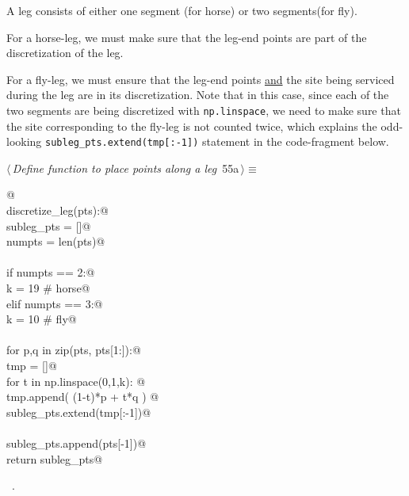 \documentclass[11.5pt]{report}
\begin{document}
A leg consists of either one segment (for horse) or two segments(for fly). 

For a horse-leg, we must make sure that the leg-end points are part of the discretization of the leg. 

For a fly-leg, we must ensure that the leg-end points \underline{and} the site being 
serviced during the leg are in its discretization. Note that in this case, 
since each of the two segments are being discretized with \verb|np.linspace|, we need
to make sure that the site corresponding to the fly-leg is not counted twice, which
explains the odd-looking \verb|subleg_pts.extend(tmp[:-1])| statement in the code-fragment below. 

\begin{flushleft} \small
\begin{minipage}{\linewidth}\label{scrap87}\raggedright\small
{} $\langle\,${\itshape Define function to place points along a leg}\nobreak\ {\footnotesize {55a}}$\,\rangle\equiv$
\vspace{-1ex}
\begin{list}{}{} \item
\mbox{}\verb@   @\\
\mbox{}\verb@def discretize_leg(pts):@\\
\mbox{}\verb@   subleg_pts = []@\\
\mbox{}\verb@   numpts     = len(pts)@\\
\mbox{}\verb@@\\
\mbox{}\verb@   if numpts == 2:@\\
\mbox{}\verb@       k  = 19 # horse@\\
\mbox{}\verb@   elif numpts == 3:@\\
\mbox{}\verb@       k  = 10 # fly@\\
\mbox{}\verb@@\\
\mbox{}\verb@   for p,q in zip(pts, pts[1:]):@\\
\mbox{}\verb@       tmp = []@\\
\mbox{}\verb@       for t in np.linspace(0,1,k): @\\
\mbox{}\verb@           tmp.append( (1-t)*p + t*q ) @\\
\mbox{}\verb@       subleg_pts.extend(tmp[:-1])@\\
\mbox{}\verb@@\\
\mbox{}\verb@   subleg_pts.append(pts[-1])@\\
\mbox{}\verb@   return subleg_pts@\\
\mbox{}\verb@@{\NWsep}
\end{list}
\vspace{-1.5ex}
\footnotesize
\begin{list}{}{\setlength{\itemsep}{-\parsep}\setlength{\itemindent}{-\leftmargin}}
\item \NWtxtMacroRefIn\ .

\item{}
\end{list}
\end{minipage}\vspace{4ex}
\end{flushleft}
\end{document}
